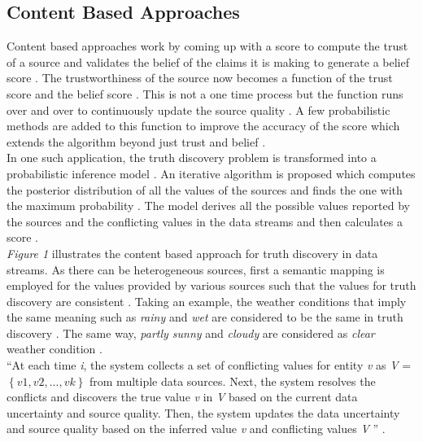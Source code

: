\documentclass[sigconf]{acmart}
\begin{document}
\subsection{Content Based Approaches}
Content based approaches work by coming up with a score to compute the trust of a source and validates the belief of the claims it is making to generate a belief score \cite{Berti-Equille2016}. The trustworthiness of the source now becomes a function of the trust score and the belief score \cite{Berti-Equille2016}. This is not a one time process but the function runs over and over to continuously update the source quality \cite{Berti-Equille2016}. A few probabilistic methods are added to this function to improve the accuracy of the score which extends the algorithm beyond just trust and belief \cite{Berti-Equille2016}. \\ In one such application, the truth discovery problem is transformed into a probabilistic inference model \cite{Zhao2014}. An iterative algorithm is proposed which computes the posterior distribution of all the values of the sources and finds the one with the maximum probability \cite{Zhao2014}. The model derives all the possible values reported by the sources and the conflicting values in the data streams and then calculates a score \cite{Zhao2014}. \\
{\em Figure 1} illustrates the content based approach for truth discovery in data streams. As there can be heterogeneous sources, first a semantic mapping is employed for the values provided by various sources such that the values for truth discovery are consistent \cite{Zhao2014}. Taking an example, the weather conditions that imply the same meaning such as {\em rainy} and {\em wet} are considered to be the same in truth discovery \cite{Zhao2014}. The same way, {\em partly sunny} and {\em cloudy} are considered as {\em clear} weather condition \cite{Zhao2014}. \\
``At each time {\em i}, the system collects a set of conflicting
values for entity {\em v} as {\em V} = $\left\{{v1,v2,...,vk}\right\}$ from multiple data sources. Next, the system resolves the conflicts and discovers the true value {\em v} in {\em V} based on the current data uncertainty and source quality. Then, the system updates the data uncertainty and source quality based on the inferred value {\em v} and conflicting values {\em V} '' \cite{Zhao2014}.
\end{document}
